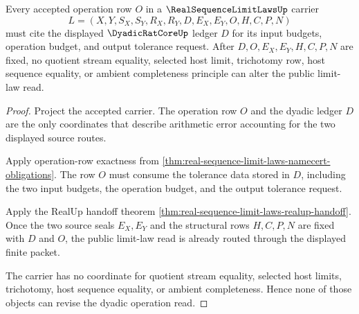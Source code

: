 \begin{theorem}
\label{thm:real-sequence-limit-laws-dyadic-operation-exhaustion}
Every accepted operation row $O$ in a $\RealSequenceLimitLawsUp$ carrier
$$
L=(X,Y,S_X,S_Y,R_X,R_Y,D,E_X,E_Y,O,H,C,P,N)
$$
must cite the displayed $\DyadicRatCoreUp$ ledger $D$ for its input budgets, operation budget, and output tolerance request. After $D,O,E_X,E_Y,H,C,P,N$ are fixed, no quotient stream equality, selected host limit, trichotomy row, host sequence equality, or ambient completeness principle can alter the public limit-law read.
\end{theorem}
\begin{proof}
Project the accepted carrier. The operation row $O$ and the dyadic ledger $D$ are the only coordinates that describe arithmetic error accounting for the two displayed source routes.

Apply operation-row exactness from \autoref{thm:real-sequence-limit-laws-namecert-obligations}. The row $O$ must consume the tolerance data stored in $D$, including the two input budgets, the operation budget, and the output tolerance request.

Apply the RealUp handoff theorem \autoref{thm:real-sequence-limit-laws-realup-handoff}. Once the two source seals $E_X,E_Y$ and the structural rows $H,C,P,N$ are fixed with $D$ and $O$, the public limit-law read is already routed through the displayed finite packet.

The carrier has no coordinate for quotient stream equality, selected host limits, trichotomy, host sequence equality, or ambient completeness. Hence none of those objects can revise the dyadic operation read.
\end{proof}

\begin{closurestatus}{\RealSequenceLimitLawsUp}
  \theoryclosure{\seedClosure}
  \formalstatus{\unformalizedV}
\end{closurestatus}
